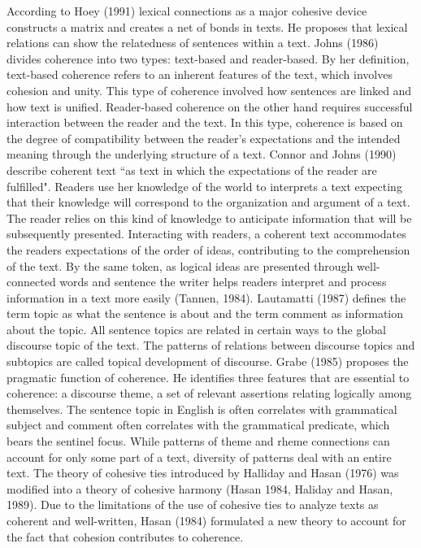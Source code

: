 According to Hoey (1991) lexical connections as a major cohesive device constructs a matrix and creates a net of bonds in texts. 
He proposes that lexical relations can show the relatedness of sentences within a text. 
Johns (1986) divides coherence into two types: text-based and reader-based. 
By her definition, text-based coherence refers to an inherent features of the text, which involves cohesion and unity. 
This type of coherence involved how sentences are linked and how text is unified. 
Reader-based coherence on the other hand requires successful interaction between the reader and the text. 
In this type, coherence is based on the degree of compatibility between the reader's expectations and the intended meaning through the underlying structure of a text. 
Connor and Johns (1990) describe coherent text ``as text in which the expectations of the reader are fulfilled".
Readers use her knowledge of the world to interprets a text expecting that their knowledge will correspond to the organization and argument of a text. 
The reader relies on this kind of knowledge to anticipate information that will be subsequently presented. 
Interacting with readers, a coherent text accommodates the readers expectations of the order of ideas, contributing to the comprehension of the text. 
By the same token, as logical ideas are presented through well-connected words and sentence the writer helps readers interpret and process information in a text more easily (Tannen, 1984).
Lautamatti (1987) defines the term topic as what the sentence is about and the term comment as information about the topic. 
All sentence topics are related in certain ways to the global discourse topic of the text. 
The patterns of relations between discourse topics and subtopics are called topical development of discourse. 
Grabe (1985) proposes the pragmatic function of coherence. 
He identifies three features that are essential to coherence: a discourse theme, a set of relevant assertions relating logically among themselves. 
The sentence topic in English is often correlates with grammatical subject and comment often correlates with the grammatical predicate, which bears the sentinel focus. 
While patterns of theme and rheme connections can account for only some part of a text, diversity of patterns deal with an entire text. 
The theory of cohesive ties introduced by Halliday and Hasan (1976) was modified into a theory of cohesive harmony (Hasan 1984, Haliday and Hasan, 1989). 
Due to the limitations of the use of cohesive ties to analyze texts as coherent and well-written, Hasan (1984) formulated a new theory to account for the fact that cohesion contributes to coherence. 
